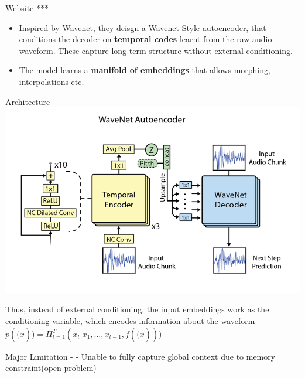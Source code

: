 \documentclass[11pt]{article}
\makeatletter
\def\maxwidth{\ifdim\Gin@nat@width>\linewidth\linewidth
    \else\Gin@nat@width\fi}
\let\Oldincludegraphics\includegraphics
\renewcommand{\includegraphics}[1]{\Oldincludegraphics[width=.8\maxwidth]{#1}}
\providecommand{\tightlist}{%
      \setlength{\itemsep}{0pt}\setlength{\parskip}{0pt}}
\makeatother
\begin{document}
\href{https://magenta.tensorflow.org/nsynth}{Website} ***

    \begin{itemize}
\tightlist
\item
  Inspired by Wavenet, they deisgn a Wavenet Style autoencoder, that
  conditions the decoder on \textbf{temporal codes} learnt from the raw
  audio waveform. These capture long term structure without external
  conditioning.
\item
  The model learns a \textbf{manifold of embeddings} that allows
  morphing, interpolations etc.
\end{itemize}

    Architecture \includegraphics{fig_05.PNG}

Thus, instead of external conditioning, the input embeddings work as the
conditioning variable, which encodes information about the waveform
\(p(\bar(x)) = \Pi_{t=1}^{T}(x_{t}|x_{1},\dots,x_{t-1},f(\bar(x)))\)

Major Limitation - - Unable to fully capture global context due to
memory constraint(open problem)


    
    
    
    
\end{document}
